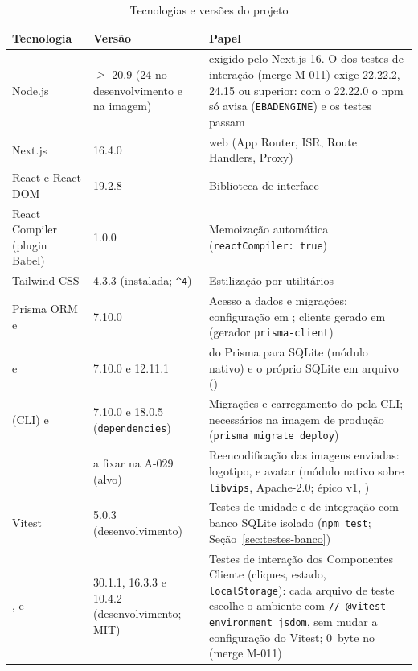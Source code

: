 \begin{table}[htb]
\caption{Tecnologias e versões do projeto}\label{tab:stack}
\small
\begin{tabularx}{\linewidth}{@{}L{4.0cm}L{3.0cm}Y@{}}
\toprule
\textbf{Tecnologia} & \textbf{Versão} & \textbf{Papel}\\
\midrule
Node.js & $\geq$ 20.9 (24 no desenvolvimento e na imagem) &  exigido pelo Next.js 16. O  dos testes de interação (merge M-011) exige 22.22.2, 24.15 ou superior: com o 22.22.0 o npm só avisa (\texttt{EBADENGINE}) e os testes passam\\
Next.js & 16.4.0 &  web (App Router, ISR, Route Handlers, Proxy)\\
React e React DOM & 19.2.8 & Biblioteca de interface\\
React Compiler (plugin Babel) & 1.0.0 & Memoização automática (\texttt{reactCompiler: true})\\
Tailwind CSS & 4.3.3 (instalada; \texttt{\^{}4}) & Estilização por utilitários\\
Prisma ORM e  & 7.10.0 & Acesso a dados e migrações; configuração em ; cliente gerado em  (gerador \texttt{prisma-client})\\
 e  & 7.10.0 e 12.11.1 &  do Prisma para SQLite (módulo nativo) e o próprio SQLite em arquivo ()\\
 (CLI) e  & 7.10.0 e 18.0.5 (\texttt{dependencies}) & Migrações e carregamento do  pela CLI; necessários na imagem de produção (\texttt{prisma migrate deploy})\\
 & a fixar na A-029 (alvo) & Reencodificação das imagens enviadas: logotipo,  e avatar (módulo nativo sobre \texttt{libvips}, Apache-2.0; épico v1, )\\
Vitest & 5.0.3 (desenvolvimento) & Testes de unidade e de integração com banco SQLite isolado (\texttt{npm test}; Seção~\ref{sec:testes-banco})\\
,  e  & 30.1.1, 16.3.3 e 10.4.2 (desenvolvimento; MIT) & Testes de interação dos Componentes Cliente (cliques, estado, \texttt{localStorage}): cada arquivo de teste escolhe o ambiente com \texttt{// @vitest-environment jsdom}, sem mudar a configuração do Vitest; 0~byte no  (merge M-011)\\

\end{tabularx}
\end{table}
